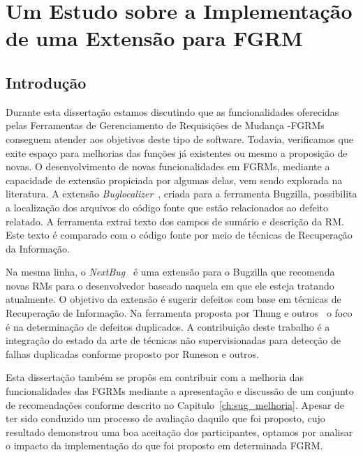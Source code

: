 \chapter{Um Estudo sobre a Implementação de uma Extensão para FGRM}
\label{ch:implemtacao_extensao}

\section{Introdução}
\label{sec:implemtacao_extensao_intro}

Durante esta dissertação estamos discutindo que as funcionalidades oferecidas
pelas Ferramentas de Gerenciamento de Requisições de Mudança \@-\@ FGRMs
conseguem atender aos objetivos deste tipo de software. Todavia, verificamos que
exite espaço para melhorias das funções já existentes ou mesmo a proposição de
novas. O desenvolvimento de novas funcionalidades em FGRMs, mediante a
capacidade de extensão propiciada por algumas delas, vem sendo explorada na
literatura. A extensão
\textit{Buglocalizer}~\cite{Thung:2014:BIT:2635868.2661678}, criada para a
ferramenta Bugzilla, possibilita a localização dos arquivos do código fonte que
estão relacionados ao defeito relatado. A ferramenta extrai texto dos campos de
sumário e descrição da RM\@. Este texto é comparado com o código fonte por meio
de técnicas de Recuperação da Informação.

Na mesma linha, o \textit{NextBug}~\cite{101186} é uma extensão para o Bugzilla
que recomenda novas RMs para o desenvolvedor baseado naquela em que ele esteja
tratando atualmente. O objetivo da extensão é sugerir defeitos com base em
técnicas de Recuperação de Informação. Na ferramenta proposta por Thung e
outros~\cite{Thung:2014:DIT:2642937.2648627} o foco é na determinação de
defeitos duplicados. A contribuição deste trabalho é a integração do estado da
arte de técnicas não supervisionadas para detecção de falhas duplicadas conforme
proposto por Runeson e outros.

Esta dissertação também se propôs em contribuir com a melhoria das
funcionalidades das FGRMs mediante a apresentação e discussão de um conjunto de
recomendações conforme descrito no Capitulo~\ref{ch:sug_melhoria}. Apesar de ter
sido conduzido um processo de avaliação daquilo que foi proposto, cujo resultado
demonstrou uma boa aceitação dos participantes, optamos por analisar o impacto
da implementação do que foi proposto em determinada FGRM\@.

